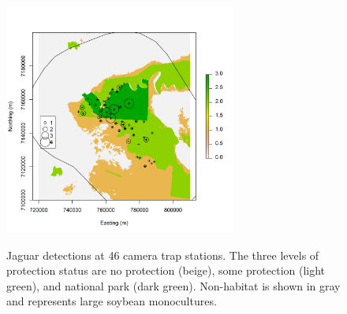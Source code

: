 \begin{figure}
\centering
\includegraphics[width=3in,height=3in]{Ch11/figs/jaguarCountMap}
\label{ch9.fig.jaguarCts}
\caption{Jaguar detections at 46 camera trap stations. The three levels of
  protection status are no protection (beige), some protection (light
  green), and national park (dark green). Non-habitat is shown in gray
  and represents large soybean monocultures. }
\end{figure}

